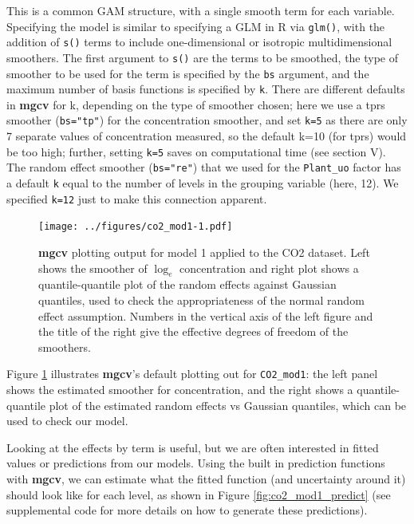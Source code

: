 \documentclass[12pt]{article}
\begin{document}
This is a common GAM structure, with a single smooth term for each
variable. Specifying the model is similar to specifying a GLM in R via
\texttt{glm()}, with the addition of \texttt{s()} terms to include
one-dimensional or isotropic multidimensional smoothers. The first
argument to \texttt{s()} are the terms to be smoothed, the type of
smoother to be used for the term is specified by the \texttt{bs}
argument, and the maximum number of basis functions is specified by
\texttt{k}. There are different defaults in \textbf{mgcv} for k,
depending on the type of smoother chosen; here we use a tprs smoother
(\texttt{bs="tp"}) for the concentration smoother, and set \texttt{k=5}
as there are only 7 separate values of concentration measured, so the
default k=10 (for tprs) would be too high; further, setting \texttt{k=5}
saves on computational time (see section V). The random effect smoother
(\texttt{bs="re"}) that we used for the \texttt{Plant\_uo} factor has a
default \texttt{k} equal to the number of levels in the grouping
variable (here, 12). We specified \texttt{k=12} just to make this
connection apparent.

\begin{figure}
\centering
\texttt{[image: ../figures/co2\_mod1-1.pdf]}
\caption{\label{fig:co2_mod1}\textbf{mgcv} plotting output for model 1
applied to the CO2 dataset. Left shows the smoother of \(\log_e\)
concentration and right plot shows a quantile-quantile plot of the
random effects against Gaussian quantiles, used to check the
appropriateness of the normal random effect assumption. Numbers in the
vertical axis of the left figure and the title of the right give the
effective degrees of freedom of the smoothers.}
\end{figure}

Figure \ref{fig:co2_mod1} illustrates \textbf{mgcv}'s default plotting
out for \texttt{CO2\_mod1}: the left panel shows the estimated smoother
for concentration, and the right shows a quantile-quantile plot of the
estimated random effects vs Gaussian quantiles, which can be used to
check our model.

Looking at the effects by term is useful, but we are often interested in
fitted values or predictions from our models. Using the built in
prediction functions with \textbf{mgcv}, we can estimate what the fitted
function (and uncertainty around it) should look like for each level, as
shown in Figure \ref{fig:co2_mod1_predict} (see supplemental code for
more details on how to generate these predictions).
\end{document}
